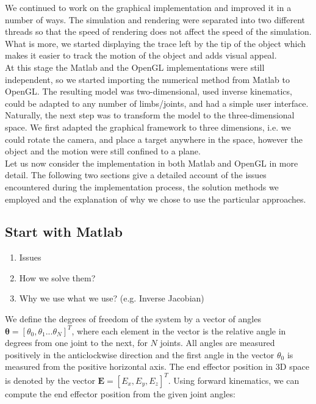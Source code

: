 \documentclass[paper=a4, fontsize=11pt]{scrartcl} %
\numberwithin{equation}{section} %
\numberwithin{figure}{section} %
\numberwithin{table}{section} %
\newcommand{\vect}[1]{\mathbf{#1}}
\newcommand{\params}{\boldsymbol{\theta}}
\begin{document}
We continued to work on the graphical implementation and improved it in a number of ways. The simulation and rendering were separated into two different threads so that the speed of rendering does not affect the speed of the simulation. What is more, we started displaying the trace left by the tip of the object which makes it easier to track the motion of the object and adds visual appeal. \\

At this stage the Matlab and the OpenGL implementations were still independent, so we started importing the numerical method from Matlab to OpenGL. The resulting model was two-dimensional, used inverse kinematics, could be adapted to any number of limbs/joints, and had a simple user interface. \\

Naturally, the next step was to transform the model to the three-dimensional space. We first adapted the graphical framework to three dimensions, i.e. we could rotate the camera, and place a target anywhere in the space, however the object and the motion were still confined to a plane. \\

Let us now consider the implementation in both Matlab and OpenGL in more detail. The following two sections give a detailed account of the issues encountered during the implementation process, the solution methods we employed and the explanation of why we chose to use the particular approaches. \\


\subsection{Start with Matlab}
    \begin{enumerate}
    \item Issues
    \item How we solve them?
    \item Why we use what we use? (e.g. Inverse Jacobian)
  \end{enumerate}
  
  We define the degrees of freedom of the system by a vector of angles $\params = [\theta_0, \theta_1...\theta_N]^T$, where each element in the vector is the relative angle in degrees from one joint to the next, for $N$ joints. All angles are measured positively in the anticlockwise direction and the first angle in the vector $\theta_0$ is measured from the positive horizontal axis. The end effector position in 3D space is denoted by the vector 
$\vect{E} = [E_x, E_y, E_z]^T$. Using forward kinematics, we can compute the end effector position from the given joint angles:
\end{document}
